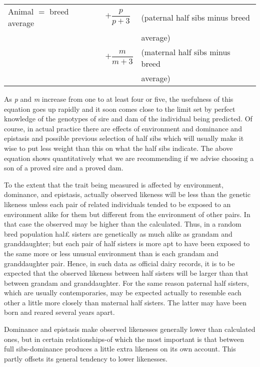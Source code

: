 {\setlength{\tabcolsep}{0.1em} %
\begin{table}[h]
	\centering
	\begin{tabular}{lll}
		Animal $=$ breed average & \(+ \dfrac{p}{p + 3}\) & (paternal half sibs minus breed\\
			   					 & 						  & average)\\
			   					 & \(+ \dfrac{m}{m + 3}\) & (maternal half sibs minus breed\\
			   					 & 						  & average)\\
	\end{tabular}
\end{table}

\noindent
As \textit{p} and \textit{m} increase from one to at least four or five, the usefulness of
this equation goes up rapidly and it soon comes close to the limit set by
perfect knowledge of the genotypes of sire and dam of the individual
being predicted. Of course, in actual practice there are effects of environment
and dominance and epistasis and possible previous selection of
half sibs which will usually make it wise to put less weight than this on
what the half sibs indicate. The above equation shows quantitatively
what we are recommending if we advise choosing a son of a proved sire
and a proved dam.

To the extent that the trait being measured is affected by environment,
dominance, and epistasis, actually observed likeness will be less
than the genetic likeness unless each pair of related individuals tended
to be exposed to an environment alike for them but different from the
environment of other pairs. In that case the observed may be higher
than the calculated. Thus, in a random bred population hal£ sisters are
genetically as much alike as grandam and granddaughter; but each pair
of half sisters is more apt to have been exposed to the same more or less
unusual environment than is each grandam and granddaughter pair.
Hence, in such data as official dairy records, it is to be expected that the
observed likeness between half sisters will be larger than that between
grandam and granddaughter. For the same reason paternal half sisters,
which are usually contemporaries, may be expected actually to resemble
each other a little more closely than maternal half sisters. The latter
may have been born and reared several years apart.

Dominance and epistasis make observed likenesses generally lower
than calculated ones, but in certain relationships-of which the most
important is that between full sibs-dominance produces a little extra
likeness on its own account. This partly offsets its general tendency to
lower likenesses.

}
